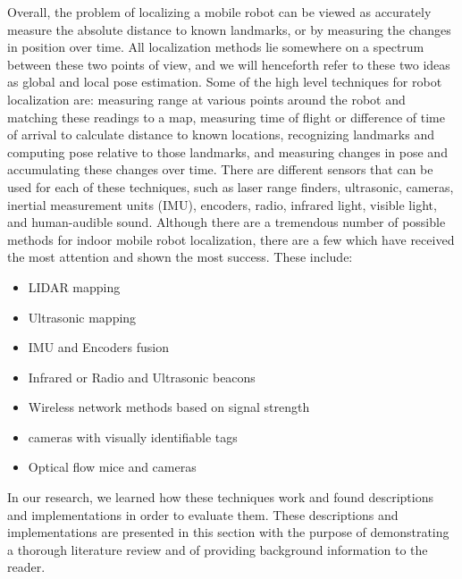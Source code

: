 \documentclass{article}
\begin{document}
   Overall, the problem of localizing a mobile robot can be viewed as accurately measure the absolute distance to known landmarks, or by measuring the changes in position over time. All localization methods lie somewhere on a spectrum between these two points of view, and we will henceforth refer to these two ideas as global and local pose estimation. Some of the high level techniques for robot localization are: measuring range at various points around the robot and matching these readings to a map, measuring time of flight or difference of time of arrival to calculate distance to known locations, recognizing landmarks and computing pose relative to those landmarks, and measuring changes in pose and accumulating these changes over time. There are different sensors that can be used for each of these techniques, such as laser range finders, ultrasonic, cameras, inertial measurement units (IMU), encoders, radio, infrared light, visible light, and human-audible sound. Although there are a tremendous number of possible methods for indoor mobile robot localization, there are a few which have received the most attention and shown the most success. These include:
  \begin{itemize}
      \item LIDAR mapping
      \item Ultrasonic mapping
      \item IMU and Encoders fusion
      \item Infrared or Radio and Ultrasonic beacons
      \item Wireless network methods based on signal strength
      \item cameras with visually identifiable tags
      \item Optical flow mice and cameras
  \end{itemize}

  In our research, we learned how these techniques work and found descriptions and implementations in order to evaluate them. These descriptions and implementations are presented in this section with the purpose of demonstrating a thorough literature review and of providing background information to the reader.
\end{document}
